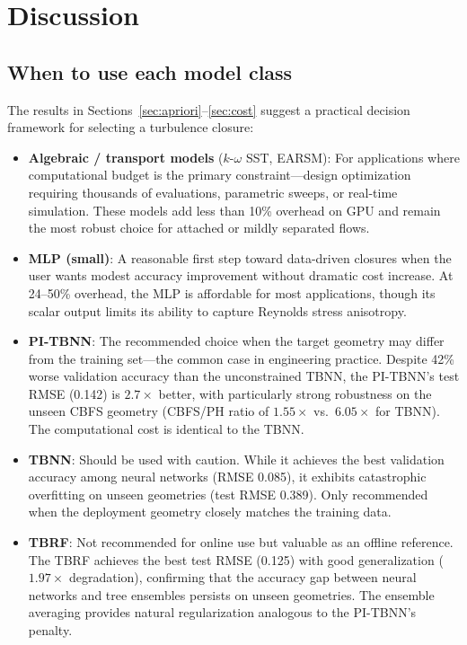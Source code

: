 \section{Discussion}
\label{sec:discussion}

\subsection{When to use each model class}

The results in Sections~\ref{sec:apriori}--\ref{sec:cost} suggest a practical decision framework for selecting a turbulence closure:

\begin{itemize}
    \item \textbf{Algebraic / transport models} ($k$-$\omega$ SST, EARSM): For applications where computational budget is the primary constraint---design optimization requiring thousands of evaluations, parametric sweeps, or real-time simulation. These models add less than 10\% overhead on GPU and remain the most robust choice for attached or mildly separated flows.

    \item \textbf{MLP (small)}: A reasonable first step toward data-driven closures when the user wants modest accuracy improvement without dramatic cost increase. At 24--50\% overhead, the MLP is affordable for most applications, though its scalar output limits its ability to capture Reynolds stress anisotropy.

    \item \textbf{PI-TBNN}: The recommended choice when the target geometry may differ from the training set---the common case in engineering practice. Despite 42\% worse validation accuracy than the unconstrained TBNN, the PI-TBNN's test RMSE (0.142) is $2.7\times$ better, with particularly strong robustness on the unseen CBFS geometry (CBFS/PH ratio of $1.55\times$ vs.\ $6.05\times$ for TBNN). The computational cost is identical to the TBNN.

    \item \textbf{TBNN}: Should be used with caution. While it achieves the best validation accuracy among neural networks (RMSE 0.085), it exhibits catastrophic overfitting on unseen geometries (test RMSE 0.389). Only recommended when the deployment geometry closely matches the training data.

    \item \textbf{TBRF}: Not recommended for online use but valuable as an offline reference. The TBRF achieves the best test RMSE (0.125) with good generalization ($1.97\times$ degradation), confirming that the accuracy gap between neural networks and tree ensembles persists on unseen geometries. The ensemble averaging provides natural regularization analogous to the PI-TBNN's penalty.
\end{itemize}


